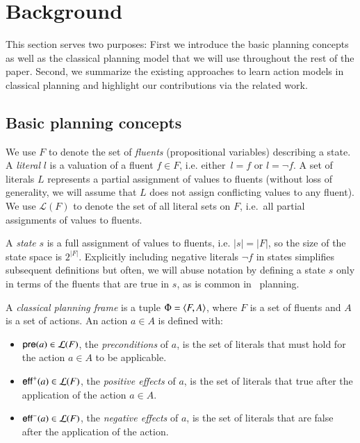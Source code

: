 \section{Background}
\label{sec:background}

This section serves two purposes: First we introduce the basic planning concepts as well as the classical planning model that we will use throughout the rest of the paper. Second, we summarize the existing approaches to learn action models in classical planning and highlight our contributions via the related work.



\subsection{Basic planning concepts}
\label{basic_planning}


We use $F$ to denote the set of {\em fluents} (propositional variables) describing a state. A {\em literal} $l$ is a valuation of a fluent $f\in F$, i.e. either~$l=f$ or $l=\neg f$. A set of literals $L$ represents a partial assignment of values to fluents (without loss of generality, we will assume that $L$ does not assign conflicting values to any fluent). We use $\mathcal{L}(F)$ to denote the set of all literal sets on $F$, i.e.~all partial assignments of values to fluents.

A {\em state} $s$ is a full assignment of values to fluents, i.e. $|s|=|F|$, so the size of the state space is $2^{|F|}$. Explicitly including negative literals $\neg f$ in states simplifies subsequent definitions but often, we will abuse notation by defining a state $s$ only in terms of the fluents that are true in $s$, as is common in \strips\ planning.

A {\em classical planning frame} is a tuple $\Phi={\langle F,A \rangle}$, where $F$ is a set of fluents and $A$ is a set of actions. An action $a\in A$ is defined with:


\begin{itemize}
\item $\mathsf{pre}(a)\in\mathcal{L}(F)$, the {\em preconditions} of $a$, is the set of literals that must hold for the action $a\in A$ to be applicable.
\item $\mathsf{eff}^+(a)\in\mathcal{L}(F)$, the {\em positive effects} of $a$, is the set of literals that true after the application of the action $a\in A$.
\item $\mathsf{eff}^-(a)\in\mathcal{L}(F)$, the {\em negative effects} of $a$, is the set of literals that are false after the application of the action.
\end{itemize}

